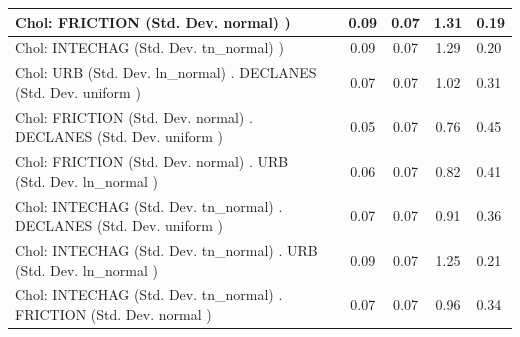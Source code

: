 \begin{table}
\begin{center}
\begin{tabular}{|l|l|c|c|c|l|}
			 Chol: FRICTION (Std. Dev. normal) ) &  & 0.09 & 0.07 & 1.31 & 0.19 \\
			\hline
			 Chol: INTECHAG (Std. Dev. tn_normal) ) &  & 0.09 & 0.07 & 1.29 & 0.20 \\
			\hline
			 Chol: URB (Std. Dev. ln_normal) . DECLANES (Std. Dev.   uniform ) &  & 0.07 & 0.07 & 1.02 & 0.31 \\
			\hline
			 Chol: FRICTION (Std. Dev. normal) . DECLANES (Std. Dev.   uniform ) &  & 0.05 & 0.07 & 0.76 & 0.45 \\
			\hline
			 Chol: FRICTION (Std. Dev. normal) . URB (Std. Dev.   ln_normal ) &  & 0.06 & 0.07 & 0.82 & 0.41 \\
			\hline
			 Chol: INTECHAG (Std. Dev. tn_normal) . DECLANES (Std. Dev.   uniform ) &  & 0.07 & 0.07 & 0.91 & 0.36 \\
			\hline
			 Chol: INTECHAG (Std. Dev. tn_normal) . URB (Std. Dev.   ln_normal ) &  & 0.09 & 0.07 & 1.25 & 0.21 \\
			\hline
			 Chol: INTECHAG (Std. Dev. tn_normal) . FRICTION (Std. Dev.   normal ) &  & 0.07 & 0.07 & 0.96 & 0.34 \\
			\hline
		\end{tabular}
	\end{center}
\end{table}